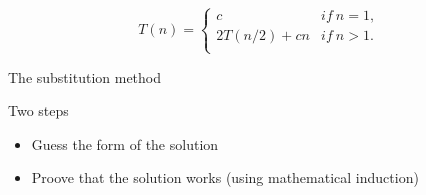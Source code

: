 \begin{frame}

  \[ 
   T(n)= \left\{
   \begin{array}{ll}
     c & if\ n = 1, \\
     2T(n/2) + cn & if\ n > 1. \\
   \end{array} 
   \right. 
   \]
  
\end{frame}

\begin{frame}


  \flushright{\itab}
\end{frame}

\begin{frame}{The substitution method}
  \begin{block}{Two steps}
    \begin{itemize}
     \item Guess the form of the solution
     \item Proove that the solution works (using mathematical induction) 
    \end{itemize}
  \end{block}
\end{frame}

